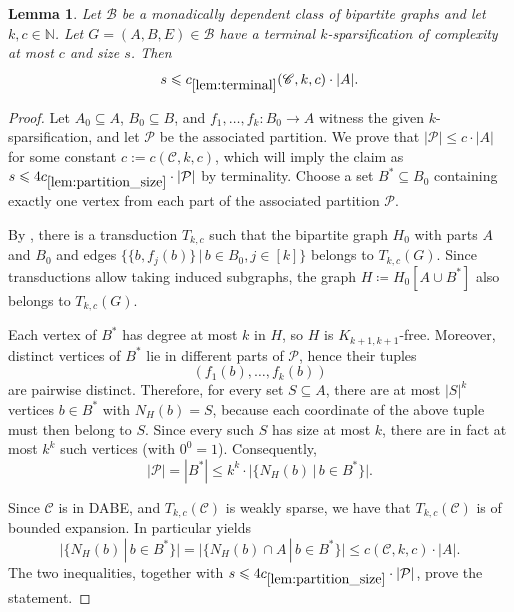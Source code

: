 \documentclass[11pt]{article}
\newtheorem{lemma}{Lemma}
\theoremstyle{definition}
\newcommand{\CC}{{\mathscr C}}
\newcommand{\BB}{{\mathscr B}}
\newcommand{\N}{\mathbb{N}}
\renewcommand{\le}{\leqslant}
\newcommand{\set}[1]{\{#1\}}
\newcommand{\setof}[2]{\set{#1 \,|\, #2 }}
\newcommand{\from}{\colon}
\renewcommand{\cal}{\mathcal}
\begin{document}
\begin{lemma}\label{lem:terminal}
  Let $\BB$ be a monadically dependent class of bipartite graphs and let $k,c\in\N$.
  Let $G=(A,B,E)\in\BB$ have a terminal $k$-sparsification of complexity at most $c$ and size $s$.
  Then
  \[
    s\le c_{\ref{lem:terminal}}(\CC, k, c) \cdot |A|.
  \]
\end{lemma}
\begin{proof}
Let $A_0\subseteq A$, $B_0\subseteq B$, and $f_1,\ldots,f_k\from B_0\to A$
witness the given $k$-sparsification,
and let $\cal P$ be the associated partition. We prove that $|\cal P|\le c \cdot |A|$ for some constant $c := c(\CC, k, c)$, which will imply the claim as $s\le 4 c_{\ref{lem:partition_size}} \cdot |\cal P|$ by terminality.
Choose a set $B^*\subseteq B_0$ containing exactly one vertex from each part of the associated partition
$\cal P$.

By , there is a transduction $T_{k,c}$ such that the
bipartite graph $H_0$ with parts $A$ and $B_0$ and
edges $\setof{\set{b,f_j(b)}}{b\in B_0,j\in[k]}$ 
belongs to $T_{k,c}(G)$.
Since transductions allow taking induced subgraphs, the graph
$H\coloneqq H_0[A\cup B^*]$ also belongs to $T_{k,c}(G)$.

Each vertex of $B^*$ has degree at most $k$ in $H$, so $H$ is
$K_{k+1,k+1}$-free.
Moreover, distinct vertices of $B^*$ lie in different parts of $\cal P$, hence
their tuples
\[
  (f_1(b),\ldots,f_k(b))
\]
are pairwise distinct.
Therefore, for every set $S\subseteq A$, there are at most $|S|^k$ vertices
$b\in B^*$ with $N_H(b)=S$, because each coordinate of the above tuple must
then belong to $S$.
Since every such $S$ has size at most $k$, there are in fact at most
$k^k$ such vertices (with $0^0=1$). Consequently, 
\[
  |\cal P|=|B^*|
  \le k^k\cdot \Big|\setof{N_H(b)}{b\in B^*}\Big|.
\]

Since $\CC$ is in DABE, and $T_{k,c}(\CC)$ is weakly sparse, we have that $T_{k,c}(\CC)$ is of bounded expansion. In particular  yields
\[
  \Big|\setof{N_H(b)}{b\in B^*}\Big|
  =\Big|\setof{N_H(b)\cap A}{b\in B^*}\Big|
  \le c(\CC, k, c) \cdot |A|.
\]
The two inequalities,
together with $s\le 4 c_{\ref{lem:partition_size}} \cdot |\cal P|$,
prove the
statement.
\end{proof}
\end{document}
